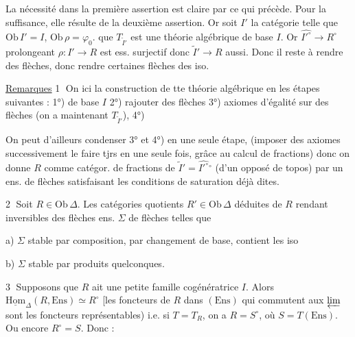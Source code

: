 La nécessité dans la première assertion est claire par ce qui précède. Pour la suffisance,  elle résulte de la deuxième assertion. Or soit $I'$ la catégorie  telle que $\mathrm{Ob}\,I'=I$, $\mathrm{Ob}\,\rho=\varphi_0$.    que $T_{\widetilde I'}$ est une théorie algébrique de base $I$. Or $\widehat{I'^\circ}\longrightarrow R^\circ$ prolongeant $\rho:I'\longrightarrow R$ est ess. surjectif  donc $\widetilde I'\longrightarrow R$ aussi. Donc il  reste à rendre  des  flèches, donc rendre certaines flèches des iso.

\uline{Remarques} \textcircled{1} On   ici  la construction de tte théorie algébrique en les étapes suivantes : 1°)  de base $I$ 2°) rajouter des flèches 3°) axiomes d'égalité sur des  flèches (on a maintenant $T_{\widetilde I'}$), 4°)  

On peut d'ailleurs condenser 3° et 4°) en une seule étape,  (imposer des axiomes successivement  le faire tjrs en une seule fois, grâce au calcul de fractions) donc on donne $R$  comme catégor. de fractions de $\widetilde I'=\widehat{I'^\circ}{}^\circ$ (d'un opposé de topos) par un ens. de flèches satisfaisant les conditions de saturation déjà dites.

\textcircled{2} Soit $R\in\mathrm{Ob}\,\Delta$. Les catégories quotients $R'\in\mathrm{Ob}\,\Delta$ déduites de $R$  rendant inversibles des flèches   ens. $\Sigma$ de flèches \deleted{$\Sigma$} telles que

a) $\Sigma$ stable par composition, par changement de base, contient les iso

b) $\Sigma$ stable par produits quelconques.

\textcircled{3} Supposons que $R$ ait une petite famille cogénératrice $I$. Alors  $\underline{\mathrm{Hom}}_{\Delta}(R,\mathrm{Ens})\simeq R^\circ$ [les foncteurs de $R$
dans $(\mathrm{Ens})$ qui commutent aux $\varprojlim$ sont les foncteurs représentables) i.e. si $T=T_R$, on a $R=S^\circ$, où $S=T(\mathrm{Ens})$.   Ou encore $R^\circ=S$. Donc :

